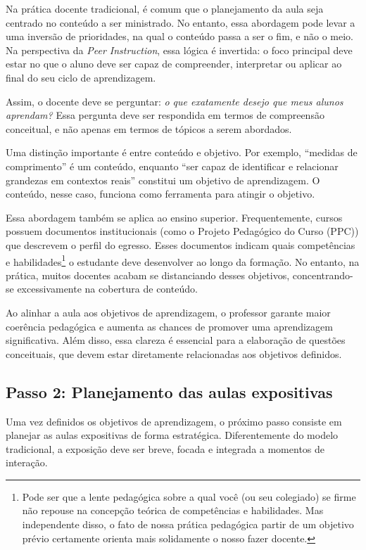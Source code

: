 Na prática docente tradicional, é comum que o planejamento da aula seja centrado no conteúdo a ser ministrado. No entanto, essa abordagem pode levar a uma inversão de prioridades, na qual o conteúdo passa a ser o fim, e não o meio. Na perspectiva da {\it Peer Instruction}, essa lógica é invertida: o foco principal deve estar no que o aluno deve ser capaz de compreender, interpretar ou aplicar ao final do seu ciclo de aprendizagem.

Assim, o docente deve se perguntar: \textit{o que exatamente desejo que meus alunos aprendam?} Essa pergunta deve ser respondida em termos de compreensão conceitual, e não apenas em termos de tópicos a serem abordados.

Uma distinção importante é entre conteúdo e objetivo. Por exemplo, ``medidas de comprimento'' é um conteúdo, enquanto ``ser capaz de identificar e relacionar grandezas em contextos reais'' constitui um objetivo de aprendizagem. O conteúdo, nesse caso, funciona como ferramenta para atingir o objetivo.

Essa abordagem também se aplica ao ensino superior. Frequentemente, cursos possuem documentos institucionais (como o Projeto Pedagógico do Curso (PPC)) que descrevem o perfil do egresso. Esses documentos indicam quais competências e habilidades\footnote{Pode ser que a lente pedagógica sobre a qual você (ou seu colegiado) se firme não repouse na concepção teórica de competências e habilidades. Mas independente disso, o fato de nossa prática pedagógica partir de um objetivo prévio certamente orienta mais solidamente o nosso fazer docente.} o estudante deve desenvolver ao longo da formação. No entanto, na prática, muitos docentes acabam se distanciando desses objetivos, concentrando-se excessivamente na cobertura de conteúdo.

Ao alinhar a aula aos objetivos de aprendizagem, o professor garante maior coerência pedagógica e aumenta as chances de promover uma aprendizagem significativa. Além disso, essa clareza é essencial para a elaboração de questões conceituais, que devem estar diretamente relacionadas aos objetivos definidos.

\subsection{Passo 2: Planejamento das aulas expositivas}

Uma vez definidos os objetivos de aprendizagem, o próximo passo consiste em planejar as aulas expositivas de forma estratégica. Diferentemente do modelo tradicional, a exposição deve ser breve, focada e integrada a momentos de interação.

